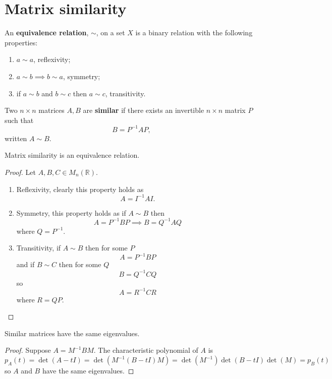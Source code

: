 \section{Matrix similarity}

\begin{definition}
    An \textbf{equivalence relation}, $\sim$, on a set $X$ is a binary relation with the following properties:
    \begin{enumerate}
        \item $a \sim a$, reflexivity;
        \item $a \sim b \implies b \sim a$, symmetry;
        \item if $a \sim b$ and $b \sim c$ then $a \sim c$, transitivity.
    \end{enumerate}
\end{definition}

\begin{definition}
    Two $n \times n$ matrices $A, B$ are \textbf{similar} if there exists an invertible $n \times n$ matrix $P$ such that \[ B = P^{-1} A P, \] written $A \sim B$.
\end{definition}

\begin{proposition}
    Matrix similarity is an equivalence relation.
\end{proposition}

\begin{proof}
    Let $A, B, C \in M_n(\mathbb{R})$.
    \begin{enumerate}
        \item Reflexivity, clearly this property holds as \[ A = I^{-1} A I. \]
        \item Symmetry, this property holds as if $A \sim B$ then \[ A = P^{-1} B P \implies B = Q^{-1} A Q \] where $Q = P^{-1}$.
        \item Transitivity, if $A \sim B$ then for some $P$ \[ A = P^{-1} B P \] and if $B \sim C$ then for some $Q$ \[ B = Q^{-1} C Q \] so \[ A = R^{-1} C R \] where $R = QP$.
    \end{enumerate}
\end{proof}

\begin{proposition}
    Similar matrices have the same eigenvalues.
\end{proposition}

\begin{proof}
    Suppose $A = M^{-1} B M$. The characteristic polynomial of $A$ is \[ p_A(t) = \det(A - tI) = \det(M^{-1} (B-tI) M)=\det(M^{-1}) \det(B-tI) \det(M) = p_B(t) \]
    so $A$ and $B$ have the same eigenvalues.
\end{proof}


